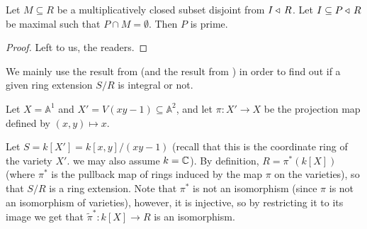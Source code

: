 \documentclass[11pt,a4paper]{article}
\newcommand{\A}{\mathbb A}
\begin{document}
\begin{exercise}
  \label{lemma:ex}
  Let $M \subseteq R$ be a multiplicatively closed subset disjoint from
  $I \triangleleft\, R$.
  Let $I \subseteq P \triangleleft\, R$ be maximal such that $P \cap M = \emptyset$.
  Then $P$ is prime.
\end{exercise}
\begin{proof}
  Left to us, the readers.
\end{proof}

\begin{remark}
  We mainly use the result from 
  (and the result from ) in order to find out
  if a given ring extension $S/R$ is integral or not.
\end{remark}

\begin{example}
  \label{ex:lying-over}
  Let $X = \A^1$ and $X' = V(xy - 1) \subseteq \A^2$,
  and let $\pi \colon X' \to X$ be the projection map
  defined by $(x,y) \mapsto x$.
  \begin{center}
  \end{center}

  Let $S = k[X'] = k[x,y]/(xy - 1)$ (recall that this is the coordinate ring
  of the variety $X'$. we may also assume $k = \mathbb{C}$).
  By definition, $R = \pi^*(k[X])$ (where $\pi^*$ is the pullback map
  of rings induced by the map $\pi$ on the varieties),
  so that $S/R$ is a ring extension.
  Note that $\pi^*$ is not an isomorphism (since $\pi$ is not an isomorphism
  of varieties), however, it is injective, so by restricting it to its
  image we get that $\tilde \pi^* \colon k[X] \to R$ is an isomorphism.


\end{example}
\end{document}
